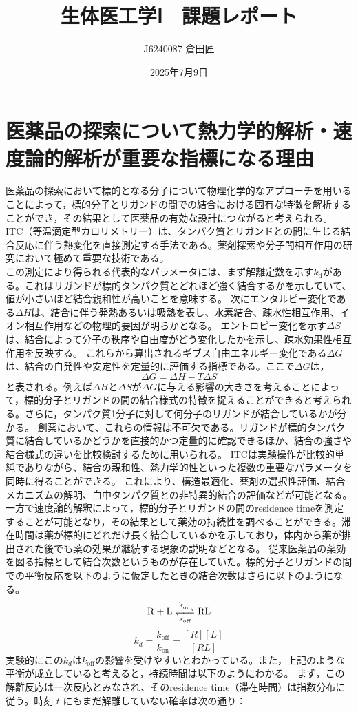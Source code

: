 \documentclass[dvipdfmx, openany,10pt]{jsarticle}
\begin{document}
\title{生体医工学Ⅰ　課題レポート}
\author{J6240087 倉田匠}
\date{2025年7月9日}
\maketitle
{\small\section{医薬品の探索について熱力学的解析・速度論的解析が重要な指標になる理由}}
医薬品の探索において標的となる分子について物理化学的なアプローチを用いることによって，標的分子とリガンドの間での結合における固有な特徴を解析することができ，その結果として医薬品の有効な設計につながると考えられる。
ITC（等温滴定型カロリメトリー）は、タンパク質とリガンドとの間に生じる結合反応に伴う熱変化を直接測定する手法である。薬剤探索や分子間相互作用の研究において極めて重要な技術である。\\
この測定により得られる代表的なパラメータには、まず解離定数を示す$k_{\text{d}}$がある。これはリガンドが標的タンパク質とどれほど強く結合するかを示していて、値が小さいほど結合親和性が高いことを意味する。
次にエンタルピー変化である$\Delta H$は、結合に伴う発熱あるいは吸熱を表し、水素結合、疎水性相互作用、イオン相互作用などの物理的要因が明らかとなる。
エントロピー変化を示す$\Delta S$は、結合によって分子の秩序や自由度がどう変化したかを示し、疎水効果性相互作用を反映する。\cite{長門石曉2020医薬品}
これらから算出されるギブス自由エネルギー変化である$\Delta G$は、結合の自発性や安定性を定量的に評価する指標である。ここで$\Delta G$は，
\[ \Delta G = \Delta H - T\Delta S \]
と表される。例えば$\Delta H$と$\Delta S$が$\Delta G$に与える影響の大きさを考えることによって，標的分子とリガンドの間の結合様式の特徴を捉えることができると考えられる。さらに，タンパク質1分子に対して何分子のリガンドが結合しているかが分かる。
創薬において、これらの情報は不可欠である。リガンドが標的タンパク質に結合しているかどうかを直接的かつ定量的に確認できるほか、結合の強さや結合様式の違いを比較検討するために用いられる。
ITCは実験操作が比較的単純でありながら、結合の親和性、熱力学的性といった複数の重要なパラメータを同時に得ることができる。
これにより、構造最適化、薬剤の選択性評価、結合メカニズムの解明、血中タンパク質との非特異的結合の評価などが可能となる。\\
\indent 一方で速度論的解釈によって，標的分子とリガンドの間のresidence timeを測定することが可能となり，その結果として薬効の持続性を調べることができる。滞在時間は薬が標的にどれだけ長く結合しているかを示しており，体内から薬が排出された後でも薬の効果が継続する現象の説明などとなる。
従来医薬品の薬効を図る指標として結合次数というものが存在していた。標的分子とリガンドの間での平衡反応を以下のように仮定したときの結合次数はさらに以下のようになる。\\
\[ \ce{R + L <=>C[k_{\text{on}}][k_{\text{off}}] RL} \]
\[ k_d = \frac{k_{\text{off}}}{k_{\text{on}}} = \frac{[R][L]}{[RL]} \]
実験的にこの$k_d$は$k_{\text{off}}$の影響を受けやすいとわかっている。\cite{copeland2016drug}また，上記のような平衡が成立していると考えると，持続時間は以下のようにわかる。
まず，この解離反応は一次反応とみなされ、そのresidence time（滞在時間）は指数分布に従う。時刻 $t$ にもまだ解離していない確率は次の通り：
\end{document}
